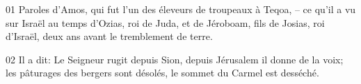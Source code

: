 01 Paroles d'Amos, qui fut l’un des éleveurs de troupeaux à Teqoa, – ce qu’il a vu sur Israël au temps d’Ozias, roi de Juda, et de Jéroboam, fils de Josias, roi d’Israël, deux ans avant le tremblement de terre.

02 Il a dit: Le Seigneur rugit depuis Sion, depuis Jérusalem il donne de la voix; les pâturages des bergers sont désolés, le sommet du Carmel est desséché.
